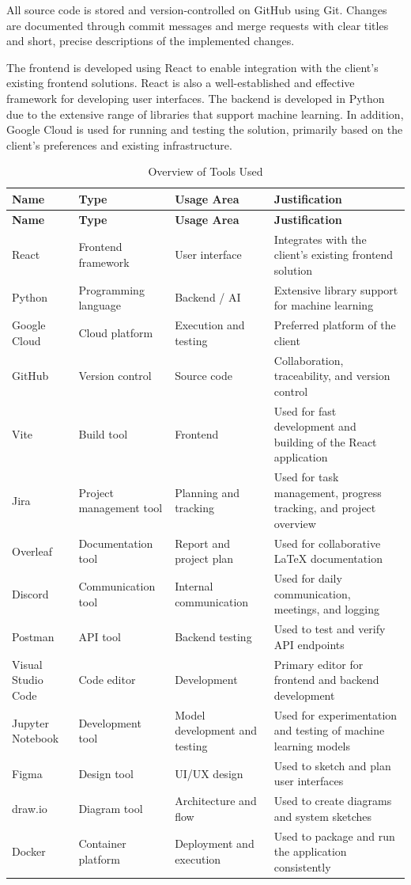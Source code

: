 All source code is stored and version-controlled on GitHub using Git. Changes are documented through commit messages and merge requests with clear titles and short, precise descriptions of the implemented changes.

The frontend is developed using React to enable integration with the client's existing frontend solutions. React is also a well-established and effective framework for developing user interfaces. The backend is developed in Python due to the extensive range of libraries that support machine learning. In addition, Google Cloud is used for running and testing the solution, primarily based on the client's preferences and existing infrastructure.

\begin{longtable}{p{}p{}p{}p{}}
\caption{Overview of Tools Used}\\
\toprule
\textbf{Name} & \textbf{Type} & \textbf{Usage Area} & \textbf{Justification} \\
\midrule
\endfirsthead
\toprule
\textbf{Name} & \textbf{Type} & \textbf{Usage Area} & \textbf{Justification} \\
\midrule
\endhead
React & Frontend framework & User interface & Integrates with the client's existing frontend solution \\
Python & Programming language & Backend / AI & Extensive library support for machine learning \\
Google Cloud & Cloud platform & Execution and testing & Preferred platform of the client \\
GitHub & Version control & Source code & Collaboration, traceability, and version control \\
Vite & Build tool & Frontend & Used for fast development and building of the React application \\
Jira & Project management tool & Planning and tracking & Used for task management, progress tracking, and project overview \\
Overleaf & Documentation tool & Report and project plan & Used for collaborative LaTeX documentation \\
Discord & Communication tool & Internal communication & Used for daily communication, meetings, and logging \\
Postman & API tool & Backend testing & Used to test and verify API endpoints \\
Visual Studio Code & Code editor & Development & Primary editor for frontend and backend development \\
Jupyter Notebook & Development tool & Model development and testing & Used for experimentation and testing of machine learning models \\
Figma & Design tool & UI/UX design & Used to sketch and plan user interfaces \\
draw.io & Diagram tool & Architecture and flow & Used to create diagrams and system sketches \\
Docker & Container platform & Deployment and execution & Used to package and run the application consistently \\
\bottomrule
\end{longtable}

